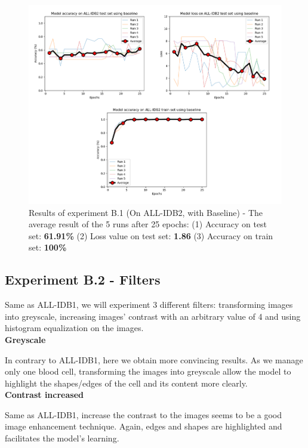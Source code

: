 \documentclass[11pt, openany]{report}
\theoremstyle{plain}
\theoremstyle{definition}
\theoremstyle{remark}
\begin{document}
\begin{figure}[H]
  \centering
  \includegraphics[scale=0.42]{Code/ch6-LeukemiaSubtypes/figures_result/ALL_IDB2/all_idb2-baseline.PNG}
  \caption{Results of experiment B.1 (On ALL-IDB2, with Baseline) - The average result of the 5 runs after 25 epochs: (1) Accuracy on test set: \textbf{61.91\%} (2) Loss value on test set: \textbf{1.86} (3) Accuracy on train set: \textbf{100\%}}
  \label{fig:results-B1}
\end{figure}

\subsection{Experiment B.2 - Filters}
Same as ALL-IDB1, we will experiment 3 different filters: transforming images into greyscale, increasing images' contrast with an arbitrary value of 4 and using histogram equalization on the images. \\

\textbf{Greyscale}

In contrary to ALL-IDB1, here we obtain more convincing results. As we manage only one blood cell, transforming the images into greyscale allow the model to highlight the shapes/edges of the cell and its content more clearly. \\ 

\textbf{Contrast increased}

Same as ALL-IDB1, increase the contrast to the images seems to be a good image enhancement technique. Again, edges and shapes are highlighted and facilitates the model's learning. \\ 
\end{document}
